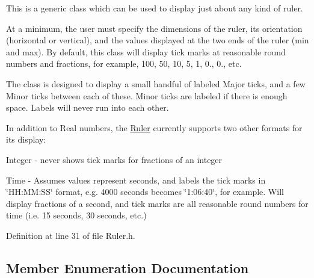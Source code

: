 This is a generic class which can be used to display just about any kind of ruler.

At a minimum, the user must specify the dimensions of the ruler, its orientation (horizontal or vertical), and the values displayed at the two ends of the ruler (min and max). By default, this class will display tick marks at reasonable round numbers and fractions, for example, 100, 50, 10, 5, 1, 0., 0., etc.

The class is designed to display a small handful of labeled Major ticks, and a few Minor ticks between each of these. Minor ticks are labeled if there is enough space. Labels will never run into each other.

In addition to Real numbers, the \hyperlink{class_ruler}{Ruler} currently supports two other formats for its display\+:

Integer -\/ never shows tick marks for fractions of an integer

Time -\/ Assumes values represent seconds, and labels the tick marks in \char`\"{}\+H\+H\+:\+M\+M\+:\+S\+S\char`\"{} format, e.\+g. 4000 seconds becomes \char`\"{}1\+:06\+:40\char`\"{}, for example. Will display fractions of a second, and tick marks are all reasonable round numbers for time (i.\+e. 15 seconds, 30 seconds, etc.) 

Definition at line 31 of file Ruler.\+h.



\subsection{Member Enumeration Documentation}

